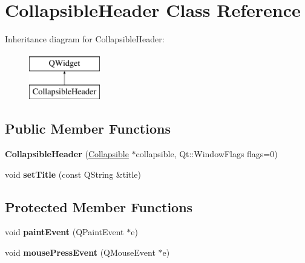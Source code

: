 \hypertarget{class_collapsible_header}{\section{Collapsible\-Header Class Reference}
\label{class_collapsible_header}
}
Inheritance diagram for Collapsible\-Header\-:\begin{figure}[H]
\begin{center}
\leavevmode
\includegraphics[height=2.000000cm]{class_collapsible_header}
\end{center}
\end{figure}
\subsection*{Public Member Functions}
\begin{DoxyCompactItemize}
\item 
\hypertarget{class_collapsible_header_a2d50891df613073a2b8ee3f3b80c61d4}{{\bfseries Collapsible\-Header} (\hyperlink{class_collapsible}{Collapsible} $\ast$collapsible, Qt\-::\-Window\-Flags flags=0)}\label{class_collapsible_header_a2d50891df613073a2b8ee3f3b80c61d4}

\item 
\hypertarget{class_collapsible_header_a55c6561ce5a140b327925df65c07535f}{void {\bfseries set\-Title} (const Q\-String \&title)}\label{class_collapsible_header_a55c6561ce5a140b327925df65c07535f}

\end{DoxyCompactItemize}
\subsection*{Protected Member Functions}
\begin{DoxyCompactItemize}
\item 
\hypertarget{class_collapsible_header_a2c752505986076679c9ff57f903e0e58}{void {\bfseries paint\-Event} (Q\-Paint\-Event $\ast$e)}\label{class_collapsible_header_a2c752505986076679c9ff57f903e0e58}

\item 
\hypertarget{class_collapsible_header_a73329989d4da52b8edfeb0ddda762c3b}{void {\bfseries mouse\-Press\-Event} (Q\-Mouse\-Event $\ast$e)}\label{class_collapsible_header_a73329989d4da52b8edfeb0ddda762c3b}

\end{DoxyCompactItemize}


